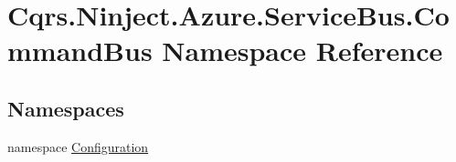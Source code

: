 \hypertarget{namespaceCqrs_1_1Ninject_1_1Azure_1_1ServiceBus_1_1CommandBus}{}\section{Cqrs.\+Ninject.\+Azure.\+Service\+Bus.\+Command\+Bus Namespace Reference}
\label{namespaceCqrs_1_1Ninject_1_1Azure_1_1ServiceBus_1_1CommandBus}
\subsection*{Namespaces}
\begin{DoxyCompactItemize}
\item 
namespace \hyperlink{namespaceCqrs_1_1Ninject_1_1Azure_1_1ServiceBus_1_1CommandBus_1_1Configuration}{Configuration}
\end{DoxyCompactItemize}
